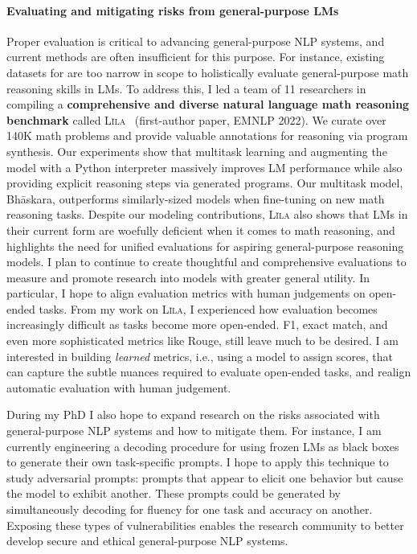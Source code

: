 \documentclass[11pt]{article}
\newcommand\lila{\textsc{L\={\i}la}\xspace}
\begin{document}
\paragraph{Evaluating and mitigating risks from general-purpose LMs}
Proper evaluation is critical to advancing general-purpose NLP systems,
and current methods are often insufficient for this purpose.
For instance, existing datasets for are too narrow in scope 
to holistically evaluate general-purpose math reasoning skills in LMs.
To address this,
I led a team of 11 researchers in compiling a
\textbf{comprehensive and diverse natural language math reasoning benchmark} 
called \lila~\cite{Mishra2022LilaAU} (first-author paper, EMNLP 2022).
We curate over 140K math problems
and provide valuable annotations for reasoning via program synthesis. 
Our experiments show that multitask learning 
and augmenting the model with a Python interpreter
massively improves LM performance 
while also providing explicit reasoning steps via generated programs.
Our multitask model, Bh\=askara, 
outperforms similarly-sized models
when fine-tuning on new math reasoning tasks.
Despite our modeling contributions, \lila also shows that LMs 
in their current form 
are woefully deficient when it comes to math reasoning,
and highlights the need for unified evaluations for 
aspiring general-purpose reasoning models.
I plan to continue to create thoughtful and comprehensive evaluations 
to measure and promote research into models with greater general utility.
In particular, I hope to align evaluation metrics
with human judgements on open-ended tasks. 
From my work on \lila, 
I experienced how evaluation becomes increasingly difficult 
as tasks become more open-ended.
F1, exact match, and even more sophisticated metrics like Rouge,
still leave much to be desired.
I am interested in building \emph{learned} metrics, 
i.e., using a model to assign scores,
that can capture the subtle nuances required to evaluate open-ended tasks,
and realign automatic evaluation with human judgement.

During my PhD I also hope to expand research on the risks associated 
with general-purpose NLP systems and how to mitigate them.
For instance, I am currently engineering a decoding procedure 
for using frozen LMs as black boxes
to generate their own task-specific prompts.
I hope to apply this technique
to study adversarial prompts:
prompts that appear to elicit one behavior 
but cause the model to exhibit another.
These prompts could be generated by simultaneously 
decoding for fluency for one task and accuracy on another.
Exposing these types of vulnerabilities
enables the research community to better develop
secure and ethical general-purpose NLP systems. 
\end{document}
